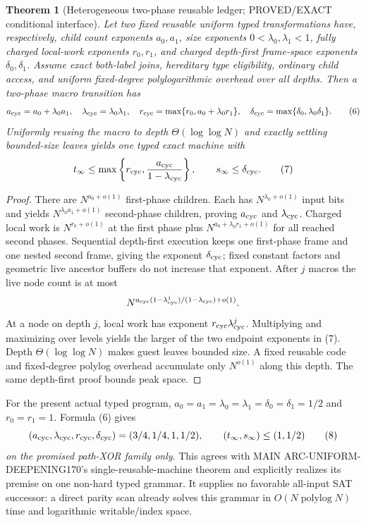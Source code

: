 \documentclass[11pt]{article}
\newtheorem{theorem}{Theorem}
\begin{document}
\begin{theorem}[Heterogeneous two-phase reusable ledger;
PROVED/EXACT conditional interface]
Let two \emph{fixed reusable uniform} typed transformations
have, respectively, child count exponents $a_0,a_1$,
size exponents $0<\lambda_0,\lambda_1<1$,
fully charged local-work exponents $r_0,r_1$,
and charged depth-first frame-space exponents
$\delta_0,\delta_1$. Assume exact both-label joins,
hereditary type eligibility, ordinary child access,
and uniform fixed-degree polylogarithmic overhead
over all depths. Then a two-phase macro transition has
\[
 a_{\rm cyc}=a_0+\lambda_0a_1,\quad
 \lambda_{\rm cyc}=\lambda_0\lambda_1,\quad
 r_{\rm cyc}=\max\{r_0,a_0+\lambda_0r_1\},\quad
 \delta_{\rm cyc}=\max\{\delta_0,\lambda_0\delta_1\}.
 \tag{6}
\]
Uniformly reusing the macro to depth
$\Theta(\log\log N)$ and exactly settling bounded-size
leaves yields one typed exact machine with
\[
 t_\infty\le\max\left\{r_{\rm cyc},
 \frac{a_{\rm cyc}}{1-\lambda_{\rm cyc}}\right\},
 \qquad s_\infty\le\delta_{\rm cyc}.
 \tag{7}
\]
\end{theorem}
\begin{proof}
There are $N^{a_0+o(1)}$ first-phase children.
Each has $N^{\lambda_0+o(1)}$ input bits and yields
$N^{\lambda_0a_1+o(1)}$ second-phase children,
proving $a_{\rm cyc}$ and $\lambda_{\rm cyc}$.
Charged local work is $N^{r_0+o(1)}$ at the first
phase plus
$N^{a_0+\lambda_0r_1+o(1)}$ for all reached
second phases. Sequential depth-first execution
keeps one first-phase frame and one nested second
frame, giving the exponent $\delta_{\rm cyc}$;
fixed constant factors and geometric live ancestor
buffers do not increase that exponent.
After $j$ macros the live node count is at most
\[
 N^{a_{\rm cyc}(1-\lambda_{\rm cyc}^j)/
 (1-\lambda_{\rm cyc})+o(1)}.
\]
At a node on depth $j$, local work has exponent
$r_{\rm cyc}\lambda_{\rm cyc}^j$. Multiplying and
maximizing over levels yields the larger of the two
endpoint exponents in (7). Depth
$\Theta(\log\log N)$ makes guest leaves bounded size.
A fixed reusable code and fixed-degree polylog overhead
accumulate only $N^{o(1)}$ along this depth.
The same depth-first proof bounds peak space.
\end{proof}

For the present actual typed program,
$a_0=a_1=\lambda_0=\lambda_1=\delta_0=\delta_1=1/2$
and $r_0=r_1=1$. Formula (6) gives
\[
 (a_{\rm cyc},\lambda_{\rm cyc},
 r_{\rm cyc},\delta_{\rm cyc})=(3/4,1/4,1,1/2),
 \qquad
 (t_\infty,s_\infty)\le(1,1/2)
 \tag{8}
\]
\emph{on the promised path-XOR family only}.
This agrees with MAIN ARC-UNIFORM-DEEPENING170's
single-reusable-machine theorem and explicitly
realizes its premise on one non-hard typed grammar.
It supplies no favorable all-input SAT successor:
a direct parity scan already solves this grammar
in $O(N\operatorname{polylog}N)$ time and logarithmic
writable/index space.
\end{document}
